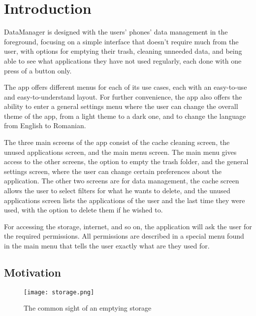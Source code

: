 
\chapter{Introduction}\label{cap:intro}

DataManager is designed with the users' phones' data management in the foreground, focusing on a simple interface that doesn't require much from the user, with options for emptying their trash, cleaning unneeded data, and being able to see what applications they have not used regularly, each done with one press of a button only.

The app offers different menus for each of its use cases, each with an easy-to-use and easy-to-understand layout. For further convenience, the app also offers the ability to enter a general settings menu where the user can change the overall theme of the app, from a light theme to a dark one, and to change the language from English to Romanian.

The three main screens of the app consist of the cache cleaning screen, the unused applications screen, and the main menu screen. The main menu gives access to the other screens, the option to empty the trash folder, and the general settings screen, where the user can change certain preferences about the application. The other two screens are for data management, the cache screen allows the user to select filters for what he wants to delete, and the unused applications screen lists the applications of the user and the last time they were used, with the option to delete them if he wished to.

For accessing the storage, internet, and so on, the application will ask the user for the required permissions. All permissions are described in a special menu found in the main menu that tells the user exactly what are they used for.

\newpage

\section{Motivation}\label{sect:Motivation}

\begin{wrapfigure}{r}{0.4\textwidth} 
    \centering
    \texttt{[image: storage.png]}
    \caption{The common sight of an emptying storage}
    \label{fig:batteryImage}
\end{wrapfigure}


